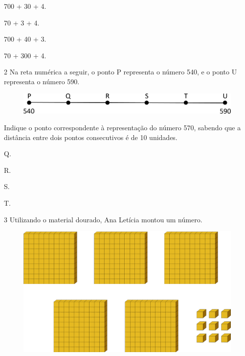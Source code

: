\begin{escolha}
\item
  700 + 30 + 4.
\item
  70 + 3 + 4.
\item
  700 + 40 + 3.
\item
  70 + 300 + 4.
\end{escolha}

\pagebreak

\num{2} Na reta numérica a seguir, o ponto P representa o número 540, e o ponto U representa o número 590.

\begin{figure}[htpb!]
\centering
\includegraphics[width=\textwidth]{./media/image8.png}
\end{figure}

Indique o ponto correspondente à representação do número 570, sabendo que a
distância entre dois pontos consecutivos é de 10 unidades.

\begin{escolha}
  \begin{multicols}{2}
\item
  Q.
\item
  R.
\item
  S.
\item
  T.
  \end{multicols}
\end{escolha}

\num{3} Utilizando o material dourado, Ana Letícia montou um número.

\begin{figure}[htpb!]
\centering
\includegraphics[width=\textwidth]{./media/image9.png}
\end{figure}

